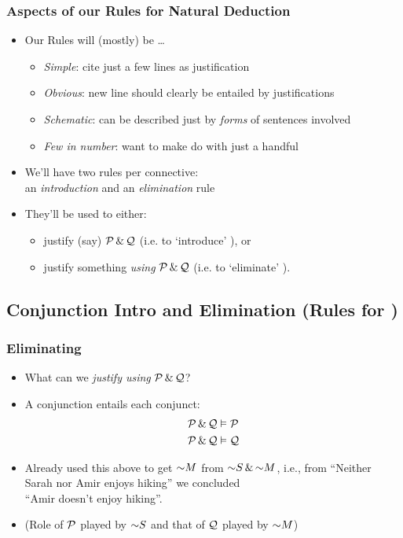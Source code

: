 \begin{frame}
  \frametitle{Aspects of our Rules for Natural Deduction}

  \begin{itemize}[<+->]
    \item Our Rules will (mostly) be \dots
      \begin{itemize}[<+->]
        \item \emph{Simple}: cite just a few lines as justification
        \item \emph{Obvious}: new line should clearly be entailed by justifications
        \item \emph{Schematic}: can be described just by \emph{forms} of
        sentences involved
        \item \emph{Few in number}: want to make do with just a handful
      \end{itemize}
    \item We'll have two rules per connective: \\ an \emph{introduction}
    and an \emph{elimination} rule
    \item They'll be used to either:
    \begin{itemize}[<+->]
      \item justify (say) $\mathcal{P} \,\&\, \mathcal{Q}$ (i.e. to `introduce' \eand), or 
    \item justify something \emph{using} $\mathcal{P}
    \,\&\, \mathcal{Q}$ (i.e. to `eliminate' \eand).
    \end{itemize}
  \end{itemize}
\end{frame}

\subsection{Conjunction Intro and Elimination (Rules for \eand)}


\begin{frame}
  \frametitle{Eliminating \eand}

  \begin{itemize}[<+->]
    \item What can we \emph{justify using} $\mathcal{P} \,\&\, \mathcal{Q}$?
    \item A conjunction entails each conjunct:
    \begin{align*}
      & \mathcal{P} \,\&\, \mathcal{Q} \vDash \mathcal{P}\\
      & \mathcal{P} \,\&\, \mathcal{Q} \vDash \mathcal{Q}
    \end{align*}
    \item Already used this above to get $\enot M$ from $\enot S \eand
    \enot M$, i.e., from ``Neither
    Sarah nor Amir enjoys hiking'' we concluded\\
 ``Amir doesn't enjoy hiking''.
    \item (Role of $\mathcal{P}$ played by $\enot S$ and that of $\mathcal{Q}$
    played by $\enot M$)
  \end{itemize}
\end{frame}

